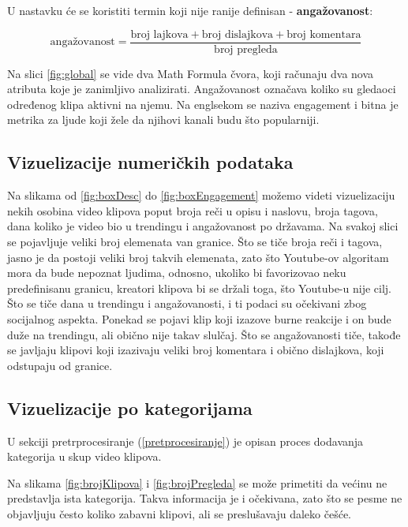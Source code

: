 \documentclass[a4paper]{article}
\theoremstyle{definition}
\begin{document}
U nastavku će se koristiti termin koji nije ranije definisan - \textbf{angažovanost}:
\newline

$$\text{angažovanost} = \frac{\text{broj lajkova} + \text{broj dislajkova} + \text{broj komentara}}{\text{broj pregleda}}$$

Na slici \ref{fig:global} se vide dva Math Formula čvora, koji računaju dva nova atributa koje je zanimljivo analizirati.
Angažovanost označava koliko su gledaoci određenog klipa aktivni na njemu. Na englsekom se naziva engagement i
bitna je metrika za ljude koji žele da njihovi kanali budu što popularniji.


\subsection{Vizuelizacije numeričkih podataka}

Na slikama od \ref{fig:boxDesc} do \ref{fig:boxEngagement} možemo videti vizuelizaciju nekih osobina video klipova poput broja reči u opisu i naslovu, broja tagova, dana koliko je video bio u trendingu i angažovanost po državama. Na svakoj slici se pojavljuje veliki broj elemenata van granice. Što se tiče broja reči i tagova, jasno je da postoji veliki broj takvih elemenata, zato što Youtube-ov algoritam mora da bude nepoznat ljudima, odnosno, ukoliko bi favorizovao neku predefinisanu granicu, kreatori klipova bi se držali toga, što Youtube-u nije cilj.
\\
Što se tiče dana u trendingu i angažovanosti, i ti podaci su očekivani zbog socijalnog aspekta. Ponekad se pojavi klip koji izazove burne reakcije i on bude duže na trendingu, ali obično nije takav slulčaj. Što se angažovanosti tiče, takođe se javljaju klipovi koji izazivaju veliki broj komentara i obično dislajkova, koji odstupaju od granice.

\subsection{Vizuelizacije po kategorijama}

U sekciji pretrprocesiranje (\ref{pretprocesiranje}) je opisan proces dodavanja kategorija u skup video klipova.

Na slikama \ref{fig:brojKlipova} i \ref{fig:brojPregleda} se može primetiti da većinu ne predstavlja ista kategorija. Takva informacija je i očekivana, zato što se pesme ne objavljuju često koliko zabavni klipovi, ali se preslušavaju daleko češće.
\end{document}
